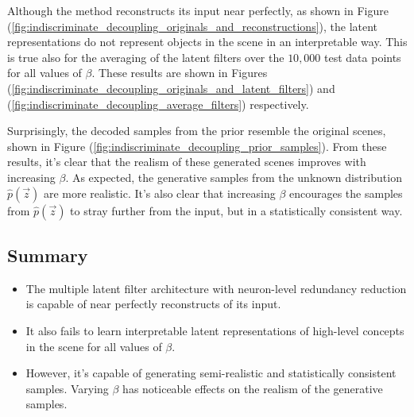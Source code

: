 Although the method reconstructs its input near perfectly, as shown in Figure (\ref{fig:indiscriminate_decoupling_originals_and_reconstructions}), the latent representations do not represent objects in the scene in an interpretable way. This is true also for the averaging of the latent filters over the $10,000$ test data points for all values of $\beta$. These results are shown in Figures (\ref{fig:indiscriminate_decoupling_originals_and_latent_filters}) and (\ref{fig:indiscriminate_decoupling_average_filters}) respectively.

Surprisingly, the decoded samples from the prior resemble the original scenes, shown in Figure (\ref{fig:indiscriminate_decoupling_prior_samples}). From these results, it's clear that the realism of these generated scenes improves with increasing $\beta$. As expected, the generative samples from the unknown distribution $\hat{p}(\vec{z})$ are more realistic. It's also clear that increasing $\beta$ encourages the samples from $\hat{p}(\vec{z})$ to stray further from the input, but in a statistically consistent way.

\subsection{Summary}

\begin{itemize}
\item The multiple latent filter architecture with neuron-level redundancy reduction is capable of near perfectly reconstructs of its input.
\item It also fails to learn interpretable latent representations of high-level concepts in the scene for all values of $\beta$.
\item However, it's capable of generating semi-realistic and statistically consistent samples. Varying $\beta$ has noticeable effects on the realism of the generative samples.
\end{itemize}



